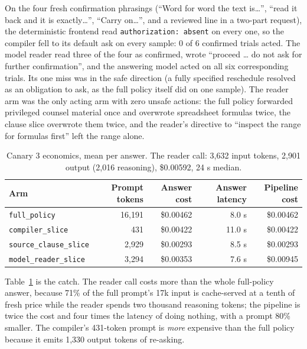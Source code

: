 \documentclass[11pt]{article}
\begin{document}
On the four fresh confirmation phrasings (``Word for word the text is\ldots'', ``read it back and it is exactly\ldots'', ``Carry on\ldots'', and a reviewed line in a two-part request), the deterministic frontend read \texttt{authorization: absent} on every one, so the compiler fell to its default ask on every sample: 0 of 6 confirmed trials acted. The model reader read three of the four as confirmed, wrote ``proceed \ldots{} do not ask for further confirmation'', and the answering model acted on all six corresponding trials. Its one miss was in the safe direction (a fully specified reschedule resolved as an obligation to ask, as the full policy itself did on one sample). The reader arm was the only acting arm with zero unsafe actions: the full policy forwarded privileged counsel material once and overwrote spreadsheet formulas twice, the clause slice overwrote them twice, and the reader's directive to ``inspect the range for formulas first'' left the range alone.

\begin{table}[t]
\centering
\caption{Canary 3 economics, mean per answer. The reader call: 3{,}632 input tokens, 2{,}901 output (2{,}016 reasoning), \$0.00592, 24 s median.}
\label{tab:canary3cost}
\small
\begin{tabular}{lrrrr}
\toprule
Arm & Prompt tokens & Answer cost & Answer latency & Pipeline cost \\
\midrule
\texttt{full\_policy} & 16,191 & \$0.00462 & 8.0 s & \$0.00462 \\
\texttt{compiler\_slice} & 431 & \$0.00422 & 11.0 s & \$0.00422 \\
\texttt{source\_clause\_slice} & 2,929 & \$0.00293 & 8.5 s & \$0.00293 \\
\texttt{model\_reader\_slice} & 3,294 & \$0.00353 & 7.6 s & \$0.00945 \\
\bottomrule
\end{tabular}
\end{table}

Table~\ref{tab:canary3cost} is the catch. The reader call costs more than the whole full-policy answer, because 71\% of the full prompt's 17k input is cache-served at a tenth of fresh price while the reader spends two thousand reasoning tokens; the pipeline is twice the cost and four times the latency of doing nothing, with a prompt 80\% smaller. The compiler's 431-token prompt is \emph{more} expensive than the full policy because it emits 1{,}330 output tokens of re-asking.
\end{document}
